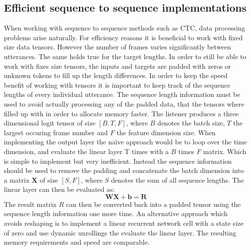 \subsection{Efficient sequence to sequence implementations}
When working with sequence to sequence methods such as CTC, data processing problems arise naturally. For efficiency reasons it is beneficial to work with
fixed size data tensors. However the number of frames varies significantly between utterances. The same holds true for the target lengths. In order to still be able to work with fixes size tensors, the inputs and targets are padded with zeros or unknown tokens to fill up the length differences.
In order to keep the speed benefit of working with tensors it is important to
keep track of the sequence lengths of every individual utterance.
The sequence length information must be used to avoid actually processing any of the padded data, that the tensors where filled up with in order to allocate memory faster.
The listener produces a three dimensional logit tensor of size $[B, T, F]$, where $B$ denotes the batch size, $T$ the largest occuring frame number and $F$ the feature dimension size. When implementing the output layer the na\"{\i}ve approach would be to loop over the time dimension, and evaluate the linear layer T times with a $B$ times $F$ matrix. Which is simple to implement but very inefficient. Instead the sequence information should be used to remove the padding and concatenate the batch dimension into a matrix $\mathbf{X}$ of size $[S, F]$, where $S$ denotes the sum of all sequence lengths. The linear layer can then be evaluated as:
\begin{equation}
\mathbf{W}\mathbf{X} + \mathbf{b} = \mathbf{R}
\end{equation}
The result matrix $R$ can then be converted back into a padded tensor using the sequence length information one more time.
An alternative approach which avoids reshaping is to implement a linear recurrent network cell with a state size of zero and use dynamic unrollings the evaluate the linear layer. The resulting memory requirements and speed are comparable.









